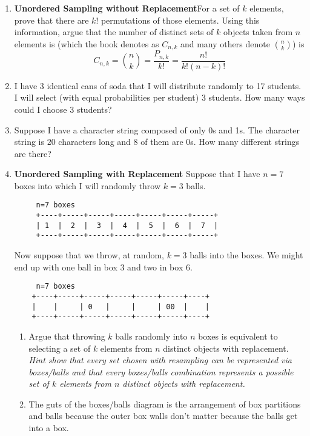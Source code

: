 \documentclass[]{book}
\begin{document}
\begin{enumerate}
\def\labelenumi{\arabic{enumi}.}
\item
  \textbf{Unordered Sampling without Replacement}For a set of \(k\)
  elements, prove that there are \(k!\) permutations of those elements.
  Using this information, argue that the number of distinct sets of
  \(k\) objects taken from \(n\) elements is (which the book denotes as
  \(C_{n,k}\) and many others denote \(\binom{n}{k}\)) is
  \[C_{n,k} = \binom{n}{k} = \frac{P_{n,k}}{k!} = \frac{n!}{k!(n-k)!}\]
\item
  I have 3 identical cans of soda that I will distribute randomly to 17
  students. I will select (with equal probabilities per student) 3
  students. How many ways could I choose 3 students?
\item
  Suppose I have a character string composed of only 0s and 1s. The
  character string is \(20\) characters long and \(8\) of them are 0s.
  How many different strings are there?
\item
  \textbf{Unordered Sampling with Replacement} Suppose that I have
  \(n=7\) boxes into which I will randomly throw \(k=3\) balls.

\begin{verbatim}
     n=7 boxes
     +----+-----+-----+-----+-----+-----+-----+
     | 1  |  2  |  3  |  4  |  5  |  6  |  7  |
     +----+-----+-----+-----+-----+-----+-----+
\end{verbatim}

  Now suppose that we throw, at random, \(k=3\) balls into the boxes. We
  might end up with one ball in box 3 and two in box 6.

\begin{verbatim}
     n=7 boxes
    +----+-----+-----+-----+-----+-----+----+
    |    |     | 0   |     |     | 00  |    |
    +----+-----+-----+-----+-----+-----+----+
\end{verbatim}

  \begin{enumerate}
  \def\labelenumii{\alph{enumii})}
  \item
    Argue that throwing \(k\) balls randomly into \(n\) boxes is
    equivalent to selecting a set of \(k\) elements from \(n\) distinct
    objects with replacement. \emph{Hint show that every set chosen with
    resampling can be represented via boxes/balls and that every
    boxes/balls combination represents a possible set of \(k\) elements
    from \(n\) distinct objects with replacement.}
  \item
    The guts of the boxes/balls diagram is the arrangement of box
    partitions and balls because the outer box walls don't matter
    because the balls get into a box.


\end{enumerate}
\end{enumerate}
\end{document}

